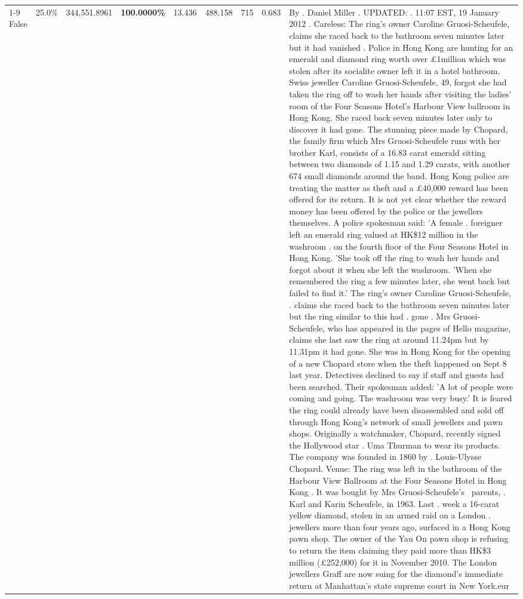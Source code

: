 \begin{table}[H]
\begin{tabular}{lllrlllll}
\cline{1-9}
False & 25.0\% & 344,551.8961 & \bfseries \color{red} 100.0000\% & 13.436 & 488.158 & 715 & 0.683 & By . Daniel Miller . UPDATED: . 11:07 EST, 19 January 2012 . Careless: The ring's owner Caroline Gruosi-Scheufele, claims she raced back to the bathroom seven minutes later but it had vanished . Police in Hong Kong are hunting for an emerald and diamond ring worth over £1million which was stolen after its socialite owner left it in a hotel bathroom. Swiss jeweller Caroline Gruosi-Scheufele, 49, forgot she had taken the ring off to wash her hands after visiting the ladies' room of the Four Seasons Hotel's Harbour View ballroom in Hong Kong. She raced back seven minutes later only to discover it had gone. The stunning piece made by Chopard, the family firm which Mrs Gruosi-Scheufele runs with her brother Karl, consists of a 16.83 carat emerald sitting between two diamonds of 1.15 and 1.29 carats, with another 674 small diamonds around the band. Hong Kong police are treating the matter as theft and a £40,000 reward has been offered for its return. It is not yet clear whether the reward money has been offered by the police or the jewellers themselves. A police spokesman said: 'A female . foreigner left an emerald ring valued at HK\$12 million in the washroom . on the fourth floor of the Four Seasons Hotel in Hong Kong. 'She took off the ring to wash her hands and forgot about it when she left the washroom. 'When she remembered the ring a few minutes later, she went back but failed to find it.' The ring's owner Caroline Gruosi-Scheufele, . claims she raced back to the bathroom seven minutes later but the ring similar to this had . gone . Mrs Gruosi-Scheufele, who has appeared in the pages of Hello magazine, claims she last saw the ring at around 11.24pm but by 11.31pm it had gone. She was in Hong Kong for the opening of a new Chopard store when the theft happened on Sept 8 last year. Detectives declined to say if staff and guests had been searched. Their spokesman added: 'A lot of people were coming and going. The washroom was very busy.' It is feared the ring could already have been disassembled and sold off through Hong Kong's network of small jewellers and pawn shops. Originally a watchmaker, Chopard, recently signed the Hollywood star . Uma Thurman to wear its products. The company was founded in 1860 by . Louis-Ulysse Chopard. Venue: The ring was left in the bathroom of the Harbour View Ballroom at the Four Seasons Hotel in Hong Kong . It was bought by Mrs Gruosi-Scheufele's  parents, . Karl and Karin Scheufele, in 1963. Last . week a 16-carat yellow diamond, stolen in an armed raid on a London . jewellers more than four years ago, surfaced in a Hong Kong pawn shop. The owner of the Yau On pawn shop is refusing to return the item claiming they paid more than HK\$3 million (£252,000) for it in November 2010. The London jewellers Graff are now suing for the diamond’s immediate return at Manhattan’s state supreme court in New York.eur \\

\end{tabular}
\end{table}
